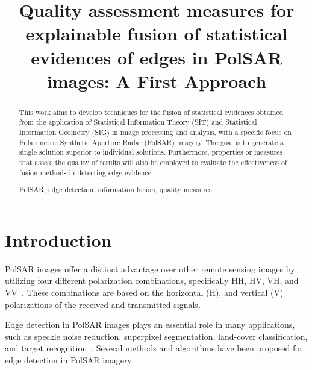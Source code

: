 \documentclass{article}
\title{Quality assessment measures for explainable fusion of statistical evidences of edges in PolSAR images: A First Approach}
\begin{document}
%
\maketitle
%
\begin{abstract}
This work aims to develop techniques for the fusion of statistical evidences obtained from the application of Statistical Information Theory (SIT) and Statistical Information Geometry (SIG) in image processing and analysis, with a specific focus on Polarimetric Synthetic Aperture Radar (PolSAR) imagery. The goal is to generate a single solution superior to individual solutions. Furthermore, properties or measures that assess the quality of results will also be employed to evaluate the effectiveness of fusion methods in detecting edge evidence.

%
\begin{keywords}
PolSAR, edge detection,  information fusion,  quality
measures 
\end{keywords}
%
\end{abstract}
\vspace{-0.3cm}
\section{Introduction}
\vspace{-0.2cm}
PolSAR images offer a distinct advantage over other remote sensing images by utilizing four different polarization combinations, specifically HH, HV, VH, and VV~\cite{Hua2022}. These combinations are based on the horizontal (H), and vertical (V) polarizations of the received and transmitted signals.

Edge detection in PolSAR images plays an essential role in many applications, such as speckle noise reduction, superpixel segmentation, land-cover classification, and target recognition~\cite{Jin2016}. 
Several methods and algorithms have been proposed for edge detection in PolSAR imagery~\cite{Gambini2007,Nascimento2014}. 

\end{document}
